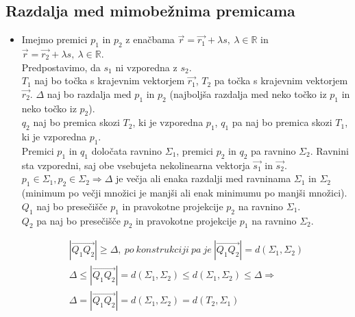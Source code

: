 \documentclass[a4paper,12pt]{article}
\begin{document}
\newpage

\begin{center}
\subsection{Razdalja med mimobežnima premicama}
\end{center}

\begin{itemize}
\item Imejmo premici $p_1$ in $p_2$ z enačbama $\vec{r}=\vec{r_1}+\lambda s,~\lambda \in \mathbb{R}$ in $\vec{r}=\vec{r_2}+\lambda s,~\lambda \in \mathbb{R}$.\\

Predpostavimo, da $s_1$ ni vzporedna z $s_2$.\\

$T_1$ naj bo točka s krajevnim vektorjem $\vec{r_1}$, $T_2$ pa točka s krajevnim vektorjem $\vec{r_2}$.  \linebreak $\Delta$ naj bo razdalja med $p_1$ in $p_2$ (najboljša razdalja med neko točko iz $p_1$ in neko točko iz $p_2$). \\

$q_2$ naj bo premica skozi $T_2$, ki je vzporedna $p_1$, $q_1$ pa naj bo premica skozi $T_1$, ki je vzporedna $p_1$. \\

Premici $p_1$ in $q_1$ določata ravnino $\Sigma_1$, premici $p_2$ in $q_2$ pa ravnino $\Sigma_2$. Ravnini sta vzporedni, saj obe vsebujeta nekolinearna vektorja $\vec{s_1}$ in $\vec{s_2}$. \\

$p_1 \in \Sigma_1, p_2 \in \Sigma_2 \Rightarrow \Delta$ je večja ali enaka razdalji med ravninama $\Sigma_1$ in $\Sigma_2$ (minimum po večji množici je manjši ali enak minimumu po manjši množici). \\

$Q_1$ naj bo presečišče $p_1$ in pravokotne projekcije $p_2$ na ravnino $\Sigma_1$. \\
$Q_2$ pa naj bo presečišče $p_2$ in pravokotne projekcije $p_1$ na ravnino $\Sigma_2$.

\begin{gather*}
|\overrightarrow{Q_1 Q_2}| \geq \Delta,~ po~konstrukciji~pa~je~|\overrightarrow{Q_1 Q_2}|=d(\Sigma_1,\Sigma_2) \\
\Delta \leq |\overrightarrow{Q_1 Q_2}|=d(\Sigma_1,\Sigma_2) \leq d(\Sigma_1,\Sigma_2) \leq \Delta \Rightarrow \\ 
\Delta = |\overrightarrow{Q_1 Q_2}|=d(\Sigma_1,\Sigma_2)=d(T_2, \Sigma_1)
\end{gather*}


\end{itemize}
\end{document}
